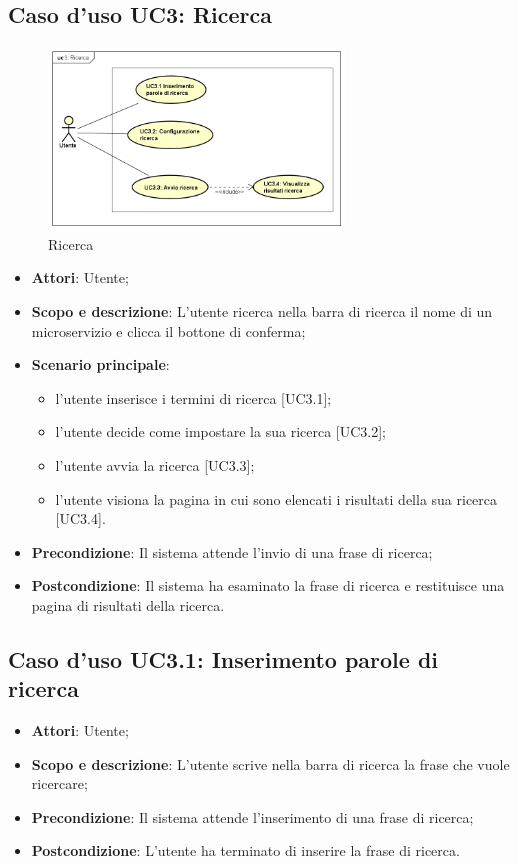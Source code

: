 \documentclass[12pt,a4paper,titlepage]{article}
\begin{document}
	\subsection{Caso d'uso UC3: Ricerca}
	\label{UC3}
	\begin{figure}[H]
		\centering
		\includegraphics[width=0.7\textwidth]{UseCase/Ricerca}
		\caption{Ricerca}
	\end{figure}
	\begin{itemize}
		\item \textbf{Attori}: Utente;
		\item \textbf{Scopo e descrizione}: L'utente ricerca nella barra di ricerca il nome di un microservizio e clicca il bottone di conferma;
		\item \textbf{Scenario principale}:
		\begin{itemize}
			\item l'utente inserisce i termini di ricerca [UC3.1];
			\item l'utente decide come impostare la sua ricerca [UC3.2];
			\item l'utente avvia la ricerca [UC3.3];
			\item l'utente visiona la pagina in cui sono elencati i risultati della sua ricerca [UC3.4].
		\end{itemize}
		\item \textbf{Precondizione}: Il sistema attende l'invio di una frase di ricerca;
		\item \textbf{Postcondizione}: Il sistema ha esaminato la frase di ricerca e restituisce una pagina di risultati della ricerca.
	\end{itemize}
	\subsection{Caso d'uso UC3.1: Inserimento parole di ricerca}
	\label{UC3.1}
	\begin{itemize}
		\item \textbf{Attori}: Utente;
		\item \textbf{Scopo e descrizione}: L'utente scrive nella barra di ricerca la frase che vuole ricercare;
		\item \textbf{Precondizione}: Il sistema attende l'inserimento di una frase di ricerca;
		\item \textbf{Postcondizione}: L'utente ha terminato di inserire la frase di ricerca.
	\end{itemize}
\end{document}
